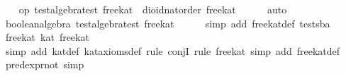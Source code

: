 \begin{isabellebody}
\ \ \isamarkupfalse%
\ {}op\ {}\isactrlbsub test{}algebra{}test\ free{}kat\isactrlesub \ {}\ dioid{}nat{}order\ free{}kat{}\isanewline
\ \ \ \ \isamarkupfalse%
\ auto\isanewline
\ \ \isamarkupfalse%
\ {}boolean{}algebra\ {}test{}algebra{}test\ free{}kat{}{}\isanewline
\ \ \ \ \isamarkupfalse%
\ {}simp\ add{}\ free{}kat{}def\ tests{}ba{}\isanewline
{}\isamarkupfalse%
%
\endisatagproof
{\isafoldproof}%
%
\isadelimproof
\isanewline
%
\endisadelimproof
\isanewline
{}\isamarkupfalse%
\ free{}kat{}\ {}kat\ free{}kat{}\isanewline
%
\isadelimproof
\ \ %
\endisadelimproof
%
\isatagproof
{}\isamarkupfalse%
\ {}simp\ add{}\ kat{}def\ kat{}axioms{}def{}\ rule\ conjI{}\ rule\ free{}kat{}{}\ simp\ add{}\ free{}kat{}def{}%
\endisatagproof
{\isafoldproof}%
%
\isadelimproof
\isanewline
%
\endisadelimproof
\isanewline
{}\isamarkupfalse%
\ pred{}expr{}not\ {}simp{}\isanewline

\end{isabellebody}
